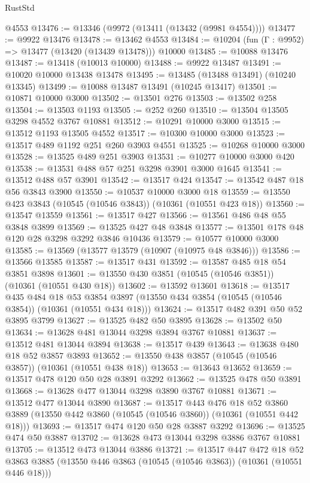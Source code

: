 \begin{lexlean}{RustStd}
\begin{coremodule}
    @4553
@13476 := @13346 (@9972 (@13411 (@13432 (@9981 @4554))))
@13477 := @9922 @13476
@13478 := @13462 @4553
@13484 := @10204 (fun (Γ : @9952) => @13477 (@13420 (@13439 @13478))) @10000
@13485 := @10088 @13476
@13487 := @13418 (@10013 @10000)
@13488 := @9922 @13487
@13491 := @10020 @10000 @13438 @13478
@13495 := @13485 (@13488 @13491) (@10240 @13345)
@13499 := @10088 @13487 @13491 (@10245 @13417)
@13501 := @10871 @10000 @3000
@13502 := @13501 @276
@13503 := @13502 @258
@13504 := @13503 @1193
@13505 := @252 @260
@13510 := @13504 @13505 @3298 @4552 @3767 @10881
@13512 := @10291 @10000 @3000
@13515 := @13512 @1193 @13505 @4552
@13517 := @10300 @10000 @3000
@13523 := @13517 @489 @1192 @251 @260 @3903 @4551
@13525 := @10268 @10000 @3000
@13528 := @13525 @489 @251 @3903
@13531 := @10277 @10000 @3000 @420
@13538 := @13531 @488 @57 @251 @3298 @3901 @3000 @1645
@13541 := @13512 @488 @57 @3901
@13542 := @13517 @424
@13547 := @13542 @487 @18 @56 @3843 @3900
@13550 := @10537 @10000 @3000 @18
@13559 := @13550 @423 @3843 (@10545 (@10546 @3843)) (@10361 (@10551 @423 @18))
@13560 := @13547 @13559
@13561 := @13517 @427
@13566 := @13561 @486 @48 @55 @3848 @3899
@13569 := @13525 @427 @48 @3848
@13577 := @13501 @178 @48 @120 @28 @3298 @3292 @3846 @10436
@13579 := @10577 @10000 @3000
@13585 := @13569 (@13577 @13579 (@10907 (@10975 @48 @3846)))
@13586 := @13566 @13585
@13587 := @13517 @431
@13592 := @13587 @485 @18 @54 @3851 @3898
@13601 := @13550 @430 @3851 (@10545 (@10546 @3851)) (@10361 (@10551 @430 @18))
@13602 := @13592 @13601
@13618 := @13517
    @435
    @484
    @18
    @53
    @3854
    @3897
    (@13550 @434 @3854 (@10545 (@10546 @3854)) (@10361 (@10551 @434 @18)))
@13624 := @13517 @482 @391 @50 @52 @3895 @3799
@13627 := @13525 @482 @50 @3895
@13628 := @13502 @50
@13634 := @13628 @481 @13044 @3298 @3894 @3767 @10881
@13637 := @13512 @481 @13044 @3894
@13638 := @13517 @439
@13643 := @13638 @480 @18 @52 @3857 @3893
@13652 := @13550 @438 @3857 (@10545 (@10546 @3857)) (@10361 (@10551 @438 @18))
@13653 := @13643 @13652
@13659 := @13517 @478 @120 @50 @28 @3891 @3292
@13662 := @13525 @478 @50 @3891
@13668 := @13628 @477 @13044 @3298 @3890 @3767 @10881
@13671 := @13512 @477 @13044 @3890
@13687 := @13517
    @443
    @476
    @18
    @52
    @3860
    @3889
    (@13550 @442 @3860 (@10545 (@10546 @3860)) (@10361 (@10551 @442 @18)))
@13693 := @13517 @474 @120 @50 @28 @3887 @3292
@13696 := @13525 @474 @50 @3887
@13702 := @13628 @473 @13044 @3298 @3886 @3767 @10881
@13705 := @13512 @473 @13044 @3886
@13721 := @13517
    @447
    @472
    @18
    @52
    @3863
    @3885
    (@13550 @446 @3863 (@10545 (@10546 @3863)) (@10361 (@10551 @446 @18)))

\end{coremodule}
\end{lexlean}

